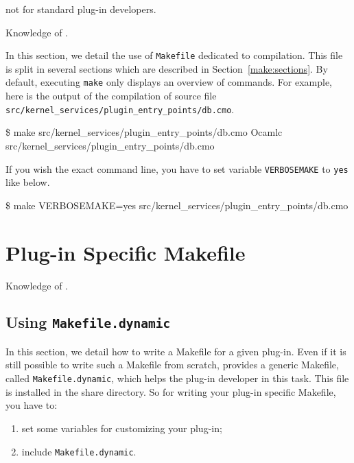 \begin{target}not for standard plug-in developers.\end{target}

\begin{prereq}
  Knowledge of \make.
\end{prereq}

In this section, we detail the use of \texttt{Makefile} dedicated to \framac
compilation. This file is split in several sections which are described in
Section~\ref{make:sections}. By default, executing \texttt{make} only displays
an overview of commands. For example, here is the output of the compilation of
source file \texttt{src/kernel\_services/plugin\_entry\_points/db.cmo}.
\begin{shell}
\$ make src/kernel_services/plugin_entry_points/db.cmo
Ocamlc      src/kernel_services/plugin_entry_points/db.cmo
\end{shell}
If you wish the exact command line, you have to set variable
\texttt{VERBOSEMAKE} to \texttt{yes} like below.
\begin{shell}
\$ make VERBOSEMAKE=yes src/kernel_services/plugin_entry_points/db.cmo
\end{shell}



\section{Plug-in Specific Makefile}\label{adv:dynamic-make}

\begin{prereq}
  Knowledge of \make.
\end{prereq}

\subsection{Using \texttt{Makefile.dynamic}}
\label{dynamic-make:dynamic}

In this section, we detail how to write a Makefile for a given plug-in. Even if
it is still possible to write such a Makefile from scratch, \framac provides a
generic Makefile, called \texttt{Makefile.dynamic},
which helps the plug-in developer in this task. This file is installed in the
\framac share directory. So for writing your plug-in specific Makefile, you
have to:
\begin{enumerate}
\item set some variables for customizing your plug-in;
\item include \texttt{Makefile.dynamic}.
\end{enumerate}

